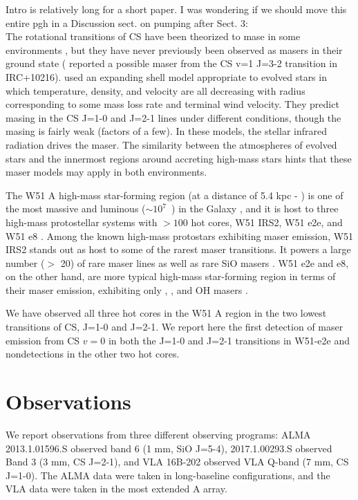 \documentclass[twocolumn]{aastex62}
\begin{document}
{\color{red} Intro is relatively long for a short paper. I was wondering if we should move this entire pgh in a Discussion sect. on pumping after Sect. 3: }\\
The rotational transitions of CS have been theorized to mase
in some environments \citep{Schoenberg1988a}, but they have
never previously been observed as masers in their ground state
(\citealt{Highberger2000a} reported a possible maser from the CS v=1 J=3-2
transition in IRC+10216).
\citet{Schoenberg1988a}
used an expanding shell model appropriate to evolved stars in which
temperature, density, and velocity are all decreasing with radius corresponding
to some mass loss rate and terminal wind velocity. They predict masing in the
CS J=1-0 and J=2-1 lines under different conditions, though the masing is
fairly weak (factors of a few).  In these models, the stellar infrared
radiation drives the maser.  The similarity between the atmospheres
of evolved stars and the innermost regions around accreting high-mass stars
hints that these maser models may apply in both environments.


The W51 A high-mass star-forming region (at a distance of 5.4 kpc -
\citealt{Sato2010a}) is one of the most massive and luminous ($\sim10^7$~\lsun)
in the Galaxy \citep{Ginsburg2017b}, and it is host to three high-mass
protostellar systems with $>100$ \msun hot cores, W51 IRS2, W51 e2e, and W51 e8
\citep{Ginsburg2017a}.  Among the known high-mass protostars exhibiting maser
emission, W51 IRS2 stands out as host to some of the rarest maser transitions.
It powers a large number ($>$ 20) of rare \ammonia maser lines as well as rare
SiO masers \citep{Henkel2013a,Goddi2015a,Hasegawa1986a,Eisner2002a}.  W51 e2e and e8, on
the other hand, are more typical high-mass star-forming region in terms of
their maser emission, exhibiting only \methanol, \water, and OH masers
\citep{Goddi2016a}.

We have observed all three hot cores in the W51 A region in the two lowest
transitions of CS, J=1-0 and J=2-1.  We report here the first detection of
maser emission from CS $v=0$ in both the J=1-0 and J=2-1 transitions in
W51-e2e and nondetections in the other two hot cores.



\section{Observations}
\label{sec:observations}
We report observations from three different observing programs:
ALMA 2013.1.01596.S \citep{Goddi2018a} observed band 6 (1 mm, SiO J=5-4), 2017.1.00293.S
observed Band 3 (3 mm, CS J=2-1), and VLA 16B-202 observed VLA Q-band (7 mm, CS J=1-0).
The ALMA data were taken in long-baseline configurations, and the VLA data
were taken in the most extended A array.
\end{document}
